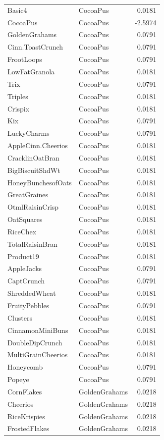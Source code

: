 \begin{longtable}{llr}
Basic4 & CocoaPus & 0.0181 \\
CocoaPus & CocoaPus & -2.5974 \\
GoldenGrahams & CocoaPus & 0.0791 \\
Cinn.ToastCrunch & CocoaPus & 0.0791 \\
FrootLoops & CocoaPus & 0.0791 \\
LowFatGranola & CocoaPus & 0.0181 \\
Trix & CocoaPus & 0.0791 \\
Triples & CocoaPus & 0.0181 \\
Crispix & CocoaPus & 0.0181 \\
Kix & CocoaPus & 0.0791 \\
LuckyCharms & CocoaPus & 0.0791 \\
AppleCinn.Cheerios & CocoaPus & 0.0181 \\
CracklinOatBran & CocoaPus & 0.0181 \\
BigBiscuitShdWt & CocoaPus & 0.0181 \\
HoneyBunchesofOats & CocoaPus & 0.0181 \\
GreatGraines & CocoaPus & 0.0181 \\
OtmlRaisinCrisp & CocoaPus & 0.0181 \\
OatSquares & CocoaPus & 0.0181 \\
RiceChex & CocoaPus & 0.0181 \\
TotalRaisinBran & CocoaPus & 0.0181 \\
Product19 & CocoaPus & 0.0181 \\
AppleJacks & CocoaPus & 0.0791 \\
CaptCrunch & CocoaPus & 0.0791 \\
ShreddedWheat & CocoaPus & 0.0181 \\
FruityPebbles & CocoaPus & 0.0791 \\
Clusters & CocoaPus & 0.0181 \\
CinnamonMiniBuns & CocoaPus & 0.0181 \\
DoubleDipCrunch & CocoaPus & 0.0181 \\
MultiGrainCheerios & CocoaPus & 0.0181 \\
Honeycomb & CocoaPus & 0.0791 \\
Popeye & CocoaPus & 0.0791 \\
CornFlakes & GoldenGrahams & 0.0218 \\
Cheerios & GoldenGrahams & 0.0218 \\
RiceKrispies & GoldenGrahams & 0.0218 \\
FrostedFlakes & GoldenGrahams & 0.0218 \\

\end{longtable}
